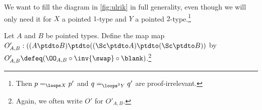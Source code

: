 \begin{remark}
We want to fill the diagram in \cref{fig:ulrik}
in full generality, even though we will only need it
for $X$ a pointed $1$-type and $Y$ a pointed $2$-type.\footnote{%
Then $p=_{\loops X}p'$ and $q=_{{\loops}^2 Y}q'$ are proof-irrelevant.}
\end{remark}

\begin{definition}\label{def:O'}
Let $A$ and $B$ be pointed types. Define the map
map $O'_{A,B}: ((A\ptdto B)\ptdto((\Sc\ptdto A)\ptdto(\Sc\ptdto B))$
by $O'_{A,B}\defeq (\OO_{A,B} \circ\inv{\swap}\circ\blank)$.\footnote{%
Again, we often write $O'$ for $O'_{A,B}$.} 
 \end{definition}

\begin{marginfigure}
  \caption{\label{fig:ptw-swap-ptd-doms} 
  $\swap$ and $\protect\ptw_*$ correspond.} 
\end{marginfigure}

